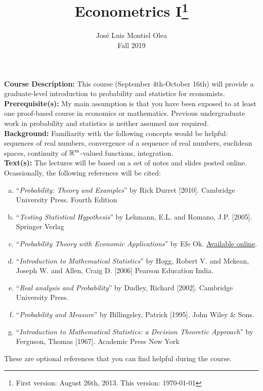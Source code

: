 \documentclass[11pt]{article}
\title {Econometrics I\thanks{First version: August 26th, 2013. This version: \today} }
\author {Jos\'e Luis Montiel Olea \protect\\
Fall 2019
}
\date{}
\begin{document}
\onehalfspace
\maketitle


\noindent \textbf{Course Description:} This course (September 4th-October 16th) will provide a graduate-level introduction to probability and statistics for economists.\\ 

\noindent \textbf{Prerequisite(s):} My main assumption is that you have been exposed to at least one proof-based course in economics or mathematics. Previous undergraduate work in probability and statistics is neither assumed nor required. \\ 

\noindent \textbf{Background:} Familiarity with the following concepts would be helpful: sequences of real numbers, convergence of a sequence of real numbers, euclidean spaces,  continuity of $\mathbb{R}^m$-valued functions, integration. \\

\noindent \textbf{Text(s):} The lectures will be based on a set of notes and slides posted online. Ocassionally, the following references will be cited:

\begin{enumerate}[a)]
\item ``\emph{Probability: Theory and Examples}'' by Rick Durret [2010]. Cambridge University Press. Fourth Edition
\item ``\emph{Testing Statistical Hypothesis}'' by Lehmann, E.L. and Romano, J.P. [2005]. Springer Verlag
\item ``\emph{Probability Theory with Economic Applications}'' by Efe Ok. \href{https://files.nyu.edu/eo1/public/books.html}{Available online}.
\item ``\emph{Introduction to Mathematical Statistics}'' by Hogg, Robert V. and Mckean, Joseph W. and Allen, Craig D. [2006] Pearson Education India. 
\item ``\emph{Real analysis and Probability}'' by Dudley, Richard [2002]. Cambridge University Press. 
\item ``\emph{Probability and Measure}'' by Billingsley, Patrick [1995]. John Wiley \& Sons. 
\item ``\emph{Introduction to Mathematical Statistics: a Decision Theoretic Approach}'' by Ferguson, Thomas [1967]. Academic Press New York
\end{enumerate}
\noindent These are optional references that you can find helpful during the course.  \\
\end{document}
